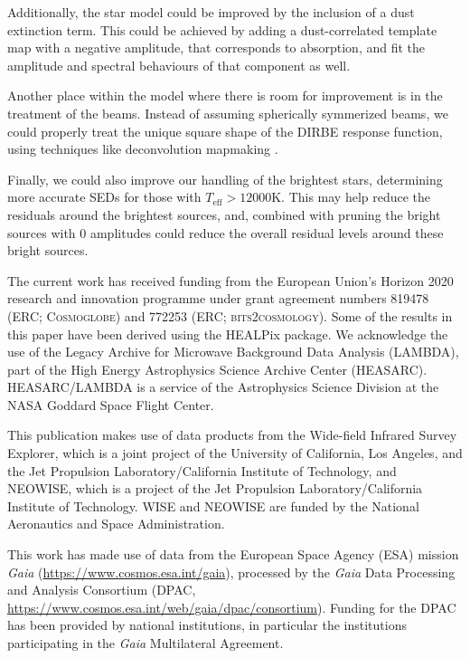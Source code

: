\documentclass{aa}
\begin{document}
Additionally, the star model could be improved by the inclusion of a dust extinction term. This could be achieved by adding a dust-correlated template map with a negative amplitude, that corresponds to absorption, and fit the amplitude and spectral behaviours of that component as well.

Another place within the model where there is room for improvement is in the treatment of the beams. Instead of assuming spherically symmerized beams, we could properly treat the unique square shape of the DIRBE response function, using techniques like deconvolution mapmaking \citep{artdeco}.

Finally, we could also improve our handling of the brightest stars, determining more accurate SEDs for those with $T_{\mathrm{eff}}>12000$K. This may help reduce the residuals around the brightest sources, and, combined with pruning the bright sources with 0 amplitudes could reduce the overall residual levels around these bright sources.


\begin{acknowledgements}
 The current work has received funding from the European
  Union’s Horizon 2020 research and innovation programme under grant
  agreement numbers 819478 (ERC; \textsc{Cosmoglobe}) and 772253 (ERC;
  \textsc{bits2cosmology}). Some of the results in this paper have been derived using the HEALPix \citep{healpix} package.
  We acknowledge the use of the Legacy Archive for Microwave Background Data
  Analysis (LAMBDA), part of the High Energy Astrophysics Science Archive Center
  (HEASARC). HEASARC/LAMBDA is a service of the Astrophysics Science Division at
  the NASA Goddard Space Flight Center.  
  
   This publication makes use of data products from the Wide-field Infrared Survey Explorer, which is a joint project of the University of California, Los Angeles, and the Jet Propulsion Laboratory/California Institute of Technology, and NEOWISE, which is a project of the Jet Propulsion Laboratory/California Institute of Technology. WISE and NEOWISE are funded by the National Aeronautics and Space Administration.
   
   This work has made use of data from the European Space Agency (ESA) mission
{\it Gaia} (\url{https://www.cosmos.esa.int/gaia}), processed by the {\it Gaia}
Data Processing and Analysis Consortium (DPAC,
\url{https://www.cosmos.esa.int/web/gaia/dpac/consortium}). Funding for the DPAC
has been provided by national institutions, in particular the institutions
participating in the {\it Gaia} Multilateral Agreement.
\end{acknowledgements}


%



\end{document}
